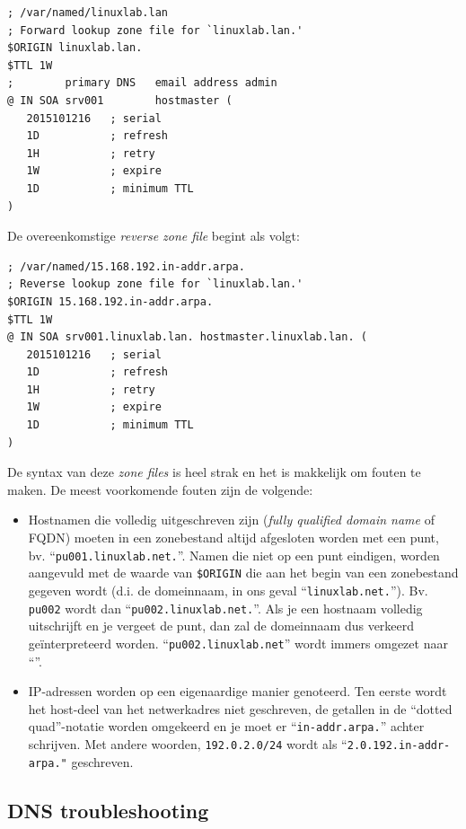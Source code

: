 \begin{verbatim}
; /var/named/linuxlab.lan
; Forward lookup zone file for `linuxlab.lan.'
$ORIGIN linuxlab.lan.
$TTL 1W
;        primary DNS   email address admin
@ IN SOA srv001        hostmaster (
   2015101216   ; serial
   1D           ; refresh
   1H           ; retry
   1W           ; expire
   1D           ; minimum TTL
)
\end{verbatim}

De overeenkomstige \emph{reverse zone file} begint als volgt:

\begin{verbatim}
; /var/named/15.168.192.in-addr.arpa.
; Reverse lookup zone file for `linuxlab.lan.'
$ORIGIN 15.168.192.in-addr.arpa.
$TTL 1W
@ IN SOA srv001.linuxlab.lan. hostmaster.linuxlab.lan. (
   2015101216   ; serial
   1D           ; refresh
   1H           ; retry
   1W           ; expire
   1D           ; minimum TTL
)
\end{verbatim}

De syntax van deze \emph{zone files} is heel strak en het is makkelijk om fouten te maken. De meest voorkomende fouten zijn de volgende:

\begin{itemize}
  \item Hostnamen die volledig uitgeschreven zijn (\emph{fully qualified domain name} of FQDN) moeten in een zonebestand altijd afgesloten worden met een punt, bv. ``\texttt{pu001.linuxlab.net.}''. Namen die niet op een punt eindigen, worden aangevuld met de waarde van \texttt{\$ORIGIN} die aan het begin van een zonebestand gegeven wordt (d.i. de domeinnaam, in ons geval ``\texttt{linuxlab.net.}''). Bv.  \texttt{pu002} wordt dan ``\texttt{pu002.linuxlab.net.}''. Als je een hostnaam volledig uitschrijft en je vergeet de punt, dan zal de domeinnaam dus verkeerd geïnterpreteerd worden. ``\texttt{pu002.linuxlab.net}'' wordt immers omgezet naar ``''.
\item IP-adressen worden op een eigenaardige manier genoteerd. Ten eerste wordt het host-deel van het netwerkadres niet geschreven, de getallen in de ``dotted quad''-notatie worden omgekeerd en je moet er ``\texttt{in-addr.arpa.}'' achter schrijven. Met andere woorden, \texttt{192.0.2.0/24} wordt als ``\texttt{2.0.192.in-addr-arpa."} geschreven.
\end{itemize}

\subsection{DNS troubleshooting}
\label{ssec:dns-troubleshooting}

